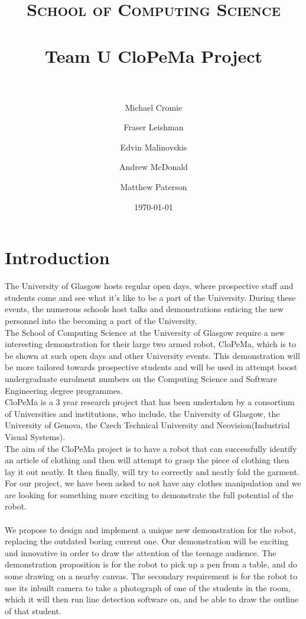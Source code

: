 \documentclass[paper=a4, fontsize=11pt]{scrartcl}
\title{
		\usefont{OT1}{bch}{b}{n}
		\normalfont \normalsize \textsc{School of Computing Science} \\ [25pt]
		\horrule{0.5pt} \\[0.4cm]
		\huge Team U CloPeMa Project \\
		\horrule{2pt} \\[0.5cm]
		}
\author{
	\usefont{OT1}{bch}{b}{n}
    	\normalfont Michael Cromie\\
    	\and
    	Fraser Leishman\\
    	\and
    	Edvin Malinovskis\\
    	\and
    	Andrew McDonald\\
    	\and
    	Matthew Paterson
	}
\date{
		\usefont{OT1}{bch}{b}{n}
		\normalfont \normalsize \today
        }
\numberwithin{equation}{section}		%
\numberwithin{figure}{section}			%
\numberwithin{table}{section}				%
\begin{document}
\maketitle


\abstract {}



\section{Introduction}

The University of Glasgow hosts regular open days, where prospective staff and students come and see what it's like to be a part of the University. During these events, the numerous schools host talks and demonstrations enticing the new personnel into the becoming a part of the University. \\
The School of Computing Science at the University of Glasgow require a new interesting demonstration for their large two armed robot, CloPeMa, which is to be shown at such open days and other University events. This demonstration will be more tailored towards prospective students and will be used in attempt boost undergraduate enrolment numbers on the Computing Science and Software Engineering degree programmes.\\
CloPeMa is a 3 year research project that has been undertaken by a consortium of Universities and institutions, who include, the University of Glasgow, the University of Genova, the Czech Technical University and Neovision(Industrial Visual Systems).\\
The aim of the CloPeMa project is to have a robot that can successfully identify an article of clothing and then will attempt to grasp the piece of clothing then lay it out neatly. It then finally, will try to correctly and neatly fold the garment. For our project, we have been asked to not have any clothes manipulation and we are looking for something more exciting to demonstrate the full potential of the robot. \\
\\
We propose to design and implement a unique new demonstration for the robot, replacing the outdated boring current one. Our demonstration will be exciting and innovative in order to draw the attention of the teenage audience. The demonstration proposition is for the robot to pick up a pen from a table, and do some drawing on a nearby canvas. The secondary requirement is for the robot to use its inbuilt camera to take a photograph of one of the students in the room, which it will then run line detection software on, and be able to draw the outline of that student.\\
\end{document}
